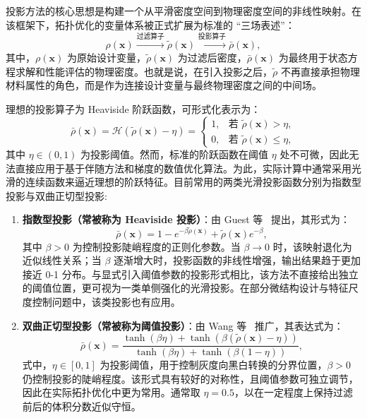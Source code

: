 投影方法的核心思想是构建一个从平滑密度空间到物理密度空间的非线性映射。在该框架下，拓扑优化的变量体系被正式扩展为标准的 “三场表述”：
\[
\rho(\boldsymbol{x}) \xrightarrow{\text{过滤算子}} \tilde{\rho}(\boldsymbol{x}) \xrightarrow{\text{投影算子}} \bar{\rho}(\boldsymbol{x}),
\]
其中，$\rho(\boldsymbol{x})$ 为原始设计变量，$\tilde{\rho}(\boldsymbol{x})$ 为过滤后密度，$\bar{\rho}(\boldsymbol{x})$ 为最终用于状态方程求解和性能评估的物理密度。也就是说，在引入投影之后，$\tilde{\rho}$ 不再直接承担物理材料属性的角色，而是作为连接设计变量与最终物理密度之间的中间场。

理想的投影算子为 Heaviside 阶跃函数，可形式化表示为：
\[
\bar{\rho}(\boldsymbol{x}) = \mathcal{H}(\tilde{\rho}(\boldsymbol{x}) - \eta) = 
\begin{cases}
	1, & \text{若 } \tilde{\rho}(\boldsymbol{x}) > \eta, \\
	0, & \text{若 } \tilde{\rho}(\boldsymbol{x}) \leq \eta,
\end{cases}
\]
其中 $\eta \in (0,1)$ 为投影阈值。然而，标准的阶跃函数在阈值 $\eta$ 处不可微，因此无法直接应用于基于伴随方法和梯度的数值优化算法。为此，实际计算中通常采用光滑的连续函数来逼近理想的阶跃特征。目前常用的两类光滑投影函数分别为指数型投影与双曲正切型投影:
\begin{enumerate}[
	label={（\arabic*）},
	labelsep=0.25em,
	leftmargin=3.2em,
	itemsep=0.4em,
	topsep=0.4em,
	parsep=0pt,
	partopsep=0pt
	]
	\item \textbf{指数型投影（常被称为 Heaviside 投影）}：由 Guest 等~\cite{guestAchievingMinimumLength2004b} 提出，其形式为：
	\begin{equation} \label{eq:ch2_exponential_projection}
		\bar{\rho}(\boldsymbol{x}) = 1 - e^{-\beta \tilde{\rho}(\boldsymbol{x})} + \tilde{\rho}(\boldsymbol{x}) e^{-\beta},
	\end{equation}
	其中 $\beta > 0$ 为控制投影陡峭程度的正则化参数。当 $\beta \to 0$ 时，该映射退化为近似线性关系；当 $\beta$ 逐渐增大时，投影函数的非线性增强，输出结果趋于更加接近 0-1 分布。与显式引入阈值参数的投影形式相比，该方法不直接给出独立的阈值位置，更可视为一类单侧强化的光滑投影。在部分微结构设计与特征尺度控制问题中，该类投影也有应用。

	\item \textbf{双曲正切型投影（常被称为阈值投影）}：由 Wang 等~\cite{wangProjectionMethodsConvergence2011a} 推广，其表达式为：
	\begin{equation} \label{eq:ch2_tanh_projection}
		\bar{\rho}(\boldsymbol{x}) = \frac{\tanh(\beta \eta) + \tanh(\beta (\tilde{\rho}(\boldsymbol{x}) - \eta))}{\tanh(\beta \eta) + \tanh(\beta (1 - \eta))},
	\end{equation}
	式中，$\eta \in [0,1]$ 为投影阈值，用于控制灰度向黑白转换的分界位置，$\beta>0$ 仍控制投影的陡峭程度。该形式具有较好的对称性，且阈值参数可独立调节，因此在实际拓扑优化中更为常用。通常取 $\eta=0.5$，以在一定程度上保持过滤前后的体积分数近似守恒。
\end{enumerate}
